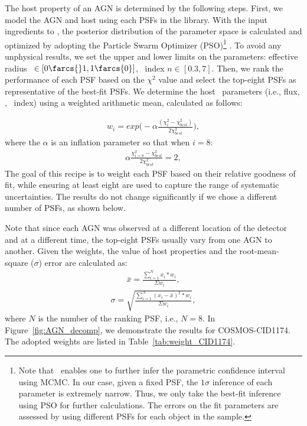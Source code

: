 \documentclass[apj]{emulateapj}
\begin{document}
The host property of an AGN is determined by the following steps. First, we model the AGN and host using each PSFs in the library. With the input ingredients to \lenstronomy, the posterior distribution of the parameter space is calculated and optimized by adopting the Particle Swarm Optimizer (PSO)\footnote{Note that \lenstronomy\ enables one to further infer the parametric confidence interval using MCMC. In our case, given a fixed PSF, the $1\sigma$ inference of each parameter is extremely narrow. Thus, we only take the best-fit inference using PSO for further calculations. The errors on the fit parameters are assessed by using different PSFs for each object in the sample.} \citep{PSO}.
To avoid any unphysical results, we set the upper and lower limits on the parameters: effective radius \Reff\ $\in[0\farcs{}1,1\farcs{0}]$, \sersic\ index $n\in[0.3,7]$.
Then, we rank the performance of each PSF based on the $\chi^2$ value and select the top-eight PSFs as representative of the best-fit PSFs. We determine the host \sersic\ parameters (i.e., flux, \Reff, \sersic\ index) using a weighted arithmetic mean, calculated as follows:

\begin{eqnarray}
\label{eq:weights}
w_i = exp \big(- \alpha \frac{ (\chi_i ^2 - \chi_{best} ^2 )}{2 \chi_{best} ^2} \big),
\end{eqnarray} 
where the $\alpha$ is an inflation parameter so that when $i=8$:
\begin{eqnarray}
\label{eq:alpha}
\alpha \frac{ \chi_{i=8} ^2 - \chi_{best} ^2 }{2 \chi_{best} ^2} = 2,
\end{eqnarray} 
The goal of this recipe is to weight each PSF based on their relative goodness of fit, while ensuring at least eight are used to capture the range of systematic uncertainties. The results do not change significantly if we chose a different number of PSFs, as shown below.

Note that since each AGN was observed at a different location of the detector and at a different time, the top-eight PSFs usually vary from one AGN to another. Given the weights, the value of host properties and the root-mean-square ($\sigma$) error are calculated as:
\begin{eqnarray}
\label{eq:infer_value}
\bar{x}  =  \frac{  \sum_{i=1}^{N}   x_i * w_i  }{\Sigma w_i} ,
\end{eqnarray} 
\begin{eqnarray}
\label{eq:infer_scatter}
\sigma =   \sqrt{ \frac{  \sum_{i=1}^{N}   (x_i -  \bar{x} ) ^2 * w_i  }{\Sigma w_i} },
\end{eqnarray} 
where $N$ is the number of the ranking PSF, i.e., $N=8$.
\noindent In Figure~\ref{fig:AGN_decomp}, we demonstrate the results for COSMOS-CID1174. The adopted weights are listed in Table~\ref{tab:weight_CID1174}. 
\end{document}
